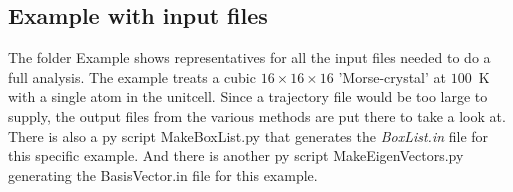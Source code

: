 \documentclass[a4paper,12pt]{article}
\begin{document}
\subsection{Example with input files}
The folder Example shows representatives for all the input files needed to do a full analysis.
The example treats a cubic $16\times16\times16$ 'Morse-crystal' at $100$~K with a single atom
in the unitcell. Since a trajectory file would be too large to supply, the output files
from the various methods are put there to take a look at.
There is also a py script MakeBoxList.py that generates the \textit{BoxList.in} file for
this specific example. And there is another py script MakeEigenVectors.py generating the
BasisVector.in file for this example.
\end{document}
